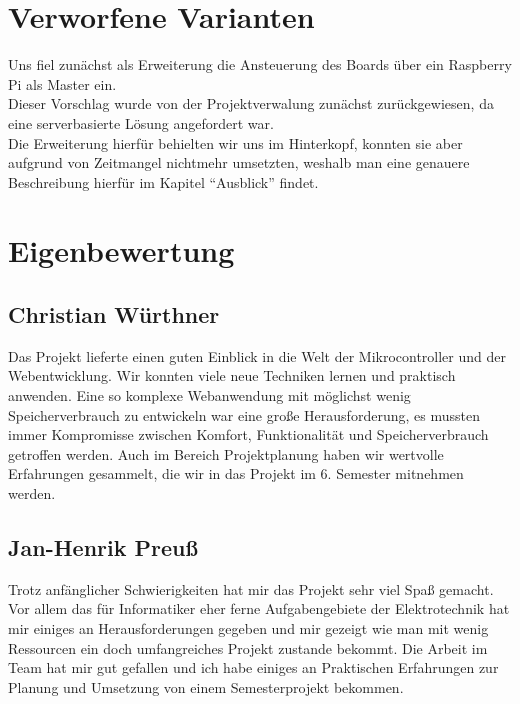 \begin{table}[H]
\begin{tabular}{p{\textwidth}|l|l|lp{\textwidth}|} \hline



\end{tabular}
\end{table}

\section{Verworfene Varianten}
Uns fiel zunächst als Erweiterung die Ansteuerung des Boards über ein Raspberry Pi als Master ein.\\
Dieser Vorschlag wurde von der Projektverwalung zunächst zurückgewiesen, da eine serverbasierte Lösung
angefordert war. \\ Die Erweiterung hierfür behielten wir uns im Hinterkopf, konnten sie aber aufgrund 
von Zeitmangel nichtmehr umsetzten, weshalb man eine genauere Beschreibung hierfür im Kapitel "`Ausblick"'
findet.
\section{Eigenbewertung}


\subsection*{Christian Würthner}
Das Projekt lieferte einen guten Einblick in die Welt der Mikrocontroller und
der Webentwicklung. Wir konnten viele neue Techniken lernen und praktisch
anwenden. Eine so komplexe Webanwendung mit möglichst wenig Speicherverbrauch zu
entwickeln war eine große Herausforderung, es mussten immer Kompromisse zwischen
Komfort, Funktionalität und Speicherverbrauch getroffen werden. Auch im Bereich
Projektplanung haben wir wertvolle Erfahrungen gesammelt, die wir in das Projekt
im 6. Semester mitnehmen werden.

\subsection*{Jan-Henrik Preuß}
Trotz anfänglicher Schwierigkeiten hat mir das Projekt sehr viel Spaß gemacht.
Vor allem das für Informatiker eher ferne Aufgabengebiete der Elektrotechnik hat
mir einiges an Herausforderungen gegeben und mir gezeigt wie man mit wenig
Ressourcen ein doch umfangreiches Projekt zustande bekommt. Die Arbeit im Team 
hat mir gut gefallen und ich habe einiges an Praktischen Erfahrungen zur Planung
und Umsetzung von einem Semesterprojekt bekommen.

